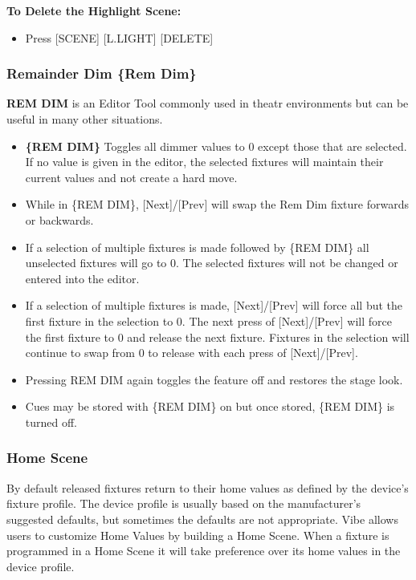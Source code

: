 \documentclass[
]{article}
\providecommand{\tightlist}{%
  \setlength{\itemsep}{0pt}\setlength{\parskip}{0pt}}
\begin{document}
\textbf{To Delete the Highlight Scene:}

\begin{itemize}
\tightlist
\item
  Press {[}SCENE{]} {[}L.LIGHT{]} {[}DELETE{]}
\end{itemize}

\hypertarget{remainder-dim-rem-dim}{%
\subsubsection{Remainder Dim \{Rem Dim\}}\label{remainder-dim-rem-dim}}

\textbf{REM DIM} is an Editor Tool commonly used in theatr environments but can be useful in many other situations.

\begin{itemize}
\item
  \textbf{\{REM DIM\}} Toggles all dimmer values to 0 except those that are selected. If no value is given in the editor, the selected fixtures will maintain their current values and not create a hard move.
\item
  While in \{REM DIM\}, {[}Next{]}/{[}Prev{]} will swap the Rem Dim fixture forwards or backwards.
\item
  If a selection of multiple fixtures is made followed by \{REM DIM\} all unselected fixtures will go to 0. The selected fixtures will not be changed or entered into the editor.
\item
  If a selection of multiple fixtures is made, {[}Next{]}/{[}Prev{]} will force all but the first fixture in the selection to 0. The next press of {[}Next{]}/{[}Prev{]} will force the first fixture to 0 and release the next fixture. Fixtures in the selection will continue to swap from 0 to release with each press of {[}Next{]}/{[}Prev{]}.
\item
  Pressing REM DIM again toggles the feature off and restores the stage look.
\item
  Cues may be stored with \{REM DIM\} on but once stored, \{REM DIM\} is turned off.
\end{itemize}

\hypertarget{home-scene}{%
\subsubsection{Home Scene}\label{home-scene}}

By default released fixtures return to their home values as defined by the device's fixture profile. The device profile is usually based on the manufacturer's suggested defaults, but sometimes the defaults are not appropriate. Vibe allows users to customize Home Values by building a Home Scene. When a fixture is programmed in a Home Scene it will take preference over its home values in the device profile.
\end{document}
